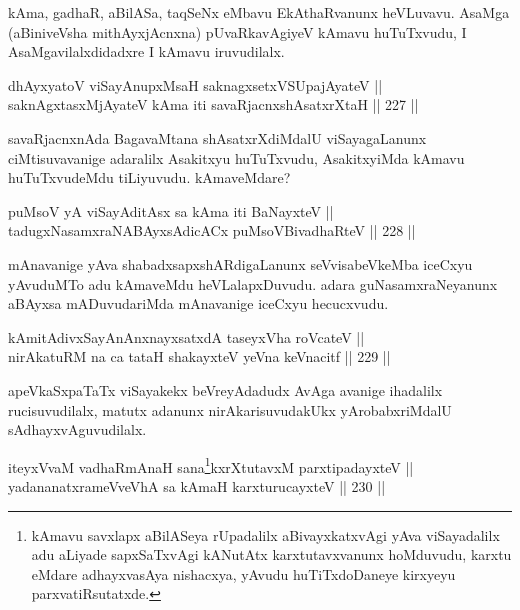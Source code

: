 \begin{artha}
kAma, gadhaR, aBilASa, taqSeNx eMbavu EkAthaRvanunx
heVLuvavu. AsaMga (aBiniveVsha mithAyxjAcnxna) pUvaRkavAgiyeV kAmavu
huTuTxvudu, I AsaMgavilalxdidadxre I kAmavu iruvudilalx.
\end{artha}


\begin{shl}
dhAyxyatoV viSayAnupxMsaH saknagxsetxVSUpajAyateV || \\
saknAgxtasxMjAyateV kAma iti savaRjacnxshAsatxrXtaH \hfill || 227 ||  
\end{shl}

\begin{artha}
savaRjacnxnAda BagavaMtana shAsatxrXdiMdalU viSayagaLanunx
ciMtisuvavanige adaralilx Asakitxyu huTuTxvudu, AsakitxyiMda kAmavu
huTuTxvudeMdu tiLiyuvudu. kAmaveMdare?
\end{artha}

\begin{shl}
puMsoV yA viSayAditAsx sa kAma iti BaNayxteV || \\
tadugxNasamxraNABAyxsAdicACx puMsoV\s BivadhaRteV \hfill || 228 ||  
\end{shl}

\begin{artha}
mAnavanige yAva shabadxsapxshARdigaLanunx seVvisabeVkeMba iceCxyu
yAvuduMTo adu kAmaveMdu heVLalapxDuvudu. adara guNasamxraNeyanunx
aBAyxsa mADuvudariMda mAnavanige iceCxyu hecucxvudu.
\end{artha}

\begin{shl}
kAmitAdivxSayAnAnxnayxsatxdA taseyxVha roVcateV || \\
nirAkatuRM na ca tataH shakayxteV yeVna keVnacitf \hfill || 229 ||  
\end{shl}

\begin{artha}
apeVkaSxpaTaTx viSayakekx beVreyAdadudx AvAga avanige ihadalilx
rucisuvudilalx, matutx adanunx nirAkarisuvudakUkx yArobabxriMdalU
sAdhayxvAguvudilalx.
\end{artha}


\begin{shl}
iteyxVvaM vadhaRmAnaH sana\footnote{kAmavu savxlapx aBilASeya rUpadalilx aBivayxkatxvAgi yAva viSayadalilx adu aLiyade sapxSaTxvAgi kANutAtx karxtutavxvanunx hoMduvudu, karxtu eMdare adhayxvasAya nishacxya, yAvudu huTiTxdoDaneye kirxyeyu parxvatiRsutatxde.}kxrXtutavxM parxtipadayxteV || \\
yadananatxrameVveVhA sa kAmaH karxturucayxteV \hfill || 230 ||  
\end{shl}

